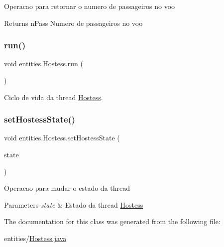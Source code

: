 Operacao para retornar o numero de passageiros no voo \begin{DoxyReturn}{Returns}
n\+Pass Numero de passageiros no voo 
\end{DoxyReturn}
\mbox{\label{classentities_1_1_hostess_a509c1f1c96b0a760860884592c7babd8}} 
\subsubsection{\texorpdfstring{run()}{run()}}
{\footnotesize\ttfamily void entities.\+Hostess.\+run (\begin{DoxyParamCaption}{ }\end{DoxyParamCaption})}

Ciclo de vida da thread \hyperlink{classentities_1_1_hostess}{Hostess}. \mbox{\label{classentities_1_1_hostess_ade5532fba6e9d58853c575ded4006507}} 
\subsubsection{\texorpdfstring{set\+Hostess\+State()}{setHostessState()}}
{\footnotesize\ttfamily void entities.\+Hostess.\+set\+Hostess\+State (\begin{DoxyParamCaption}\item[{\hyperlink{enumentities_1_1_hostess_enum}{Hostess\+Enum}}]{state }\end{DoxyParamCaption})}

Operacao para mudar o estado da thread 
\begin{DoxyParams}{Parameters}
{\em state} & Estado da thread \hyperlink{classentities_1_1_hostess}{Hostess} \\
\hline
\end{DoxyParams}


The documentation for this class was generated from the following file\+:\begin{DoxyCompactItemize}
\item 
entities/\hyperlink{_hostess_8java}{Hostess.\+java}\end{DoxyCompactItemize}
